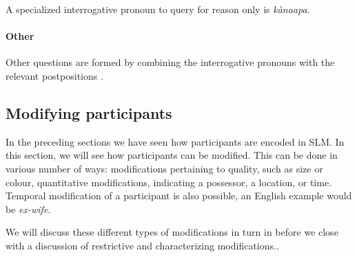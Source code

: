 

A specialized interrogative pronoun to query for reason only is \em kànaapa\em.







\paragraph{Other}\label{sec:func:q:Other}
Other questions are formed by combining the interrogative pronouns with the relevant postpositions  .






\subsection{Modifying participants}\label{sec:func:Modifyingparticipants}
In the preceding sections we have seen how participants are encoded in SLM. In this section, we will see how participants can be modified. This can be done in various number of ways:
modifications pertaining to quality, such as size or colour,
quantitative modifications,
indicating a possessor,
a location, or time.
Temporal modification of a participant is also possible, an English example would be \em ex-wife\em.

We will discuss these different types of modifications in turn in  before we close with a discussion of  restrictive and characterizing modifications..



